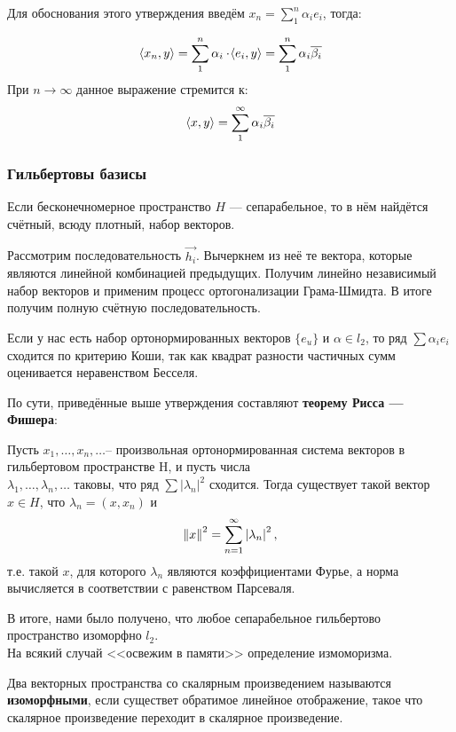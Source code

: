\documentclass[12pt]{article}
\begin{document}
			Для обоснования этого утверждения введём $x_n = \sum_1^n \alpha_i e_i$, тогда:

			$$ \left\langle x_n, y \right\rangle = \sum_1^n \alpha_i \cdot \! \left\langle e_i, y \right\rangle = \sum_1^n \alpha_i \overline{\beta_i}$$
			При $n \rightarrow \infty$ данное выражение стремится к:
			$$ \left\langle x, y \right\rangle = \sum_1^{\infty} \alpha_i \overline{\beta_i} $$

		\subsubsection{Гильбертовы базисы}

			Если бесконечномерное пространство $H$ --- сепарабельное, то в нём найдётся счётный, всюду плотный, набор векторов.
	
			Рассмотрим последовательность $\vec{h_i}$. Вычеркнем из неё те вектора, которые являются линейной комбинацией предыдущих.
			Получим линейно независимый набор векторов и применим процесс ортогонализации Грама-Шмидта. В итоге получим полную счётную 
			последовательность.

			Если у нас есть набор ортонормированных векторов $\{ e_u \}$ и $\alpha \in l_2$, то ряд $\sum \alpha_i e_i$ сходится по 
		критерию Коши, так как квадрат разности частичных сумм оценивается неравенством Бесселя.
	
		По сути, приведённые выше утверждения составляют \textbf{теорему Рисса --- Фишера}:
		\begin{theorem}
			Пусть $x_1, \dots ,x_n, \dots $-- произвольная ортонормированная система векторов в гильбертовом пространстве H, и пусть 
			числа \\
			$\lambda _1, \dots ,\lambda _n, \dots $ таковы, что ряд $\sum |\lambda_n|^2$ сходится. Тогда существует такой 
			вектор $x\in H$, что $\lambda _n=(x,x_n)$ и
			$$
				\left\| x \right\| ^2=\sum_{n=1}^{\infty } \left| \lambda_n \right|^2,
			$$
			т.е. такой $x$, для которого $\lambda_n$ являются коэффициентами Фурье, а норма вычисляется в 
			соответствии с равенством Парсеваля. 
		\end{theorem}
	
		В итоге, нами было получено, что любое сепарабельное гильбертово пространство изоморфно $l_2$. \\
		На всякий случай <<освежим в памяти>> определение измоморизма.
		\begin{defi}
			Два векторных пространства со скалярным произведением называются 
			\textbf{изоморфными}, если существет обратимое линейное отображение, 
			такое что скалярное произведение переходит в скалярное произведение.
		\end{defi}
	
\end{document}
